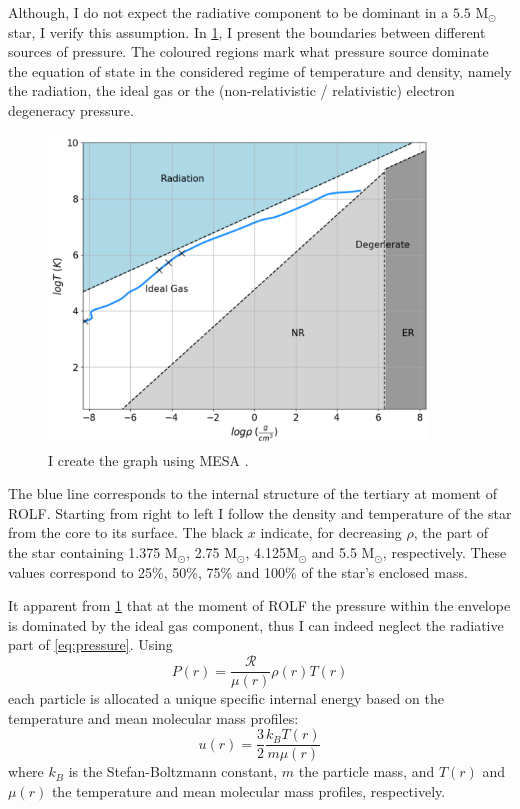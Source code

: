 Although, I do not expect the radiative component to be dominant in a $5.5$ M$_{\odot}$ star, I verify this assumption. In \cref{fig:eos}, I present the boundaries between different sources of pressure. The coloured regions mark what pressure source dominate the equation of state in the considered regime of temperature and density, namely the radiation, the ideal gas or the (non-relativistic / relativistic) electron degeneracy
pressure.
\begin{figure}[H]
    \centering
    \includegraphics[width=0.9\textwidth]{Thesis/graphs/eos.pdf}
    \caption{ I create the graph using MESA \citep{paxton2010modules,paxton2013modules,paxton2015modules,paxton2019modules}.}
    \label{fig:eos}
\end{figure}
The blue line corresponds to the internal structure of the tertiary at moment of ROLF. Starting from right to left I follow the density and temperature of the star from the core to its surface. The black $x$ indicate, for decreasing $\rho$, the part of the star containing 1.375 M$_{\odot}$, 2.75 M$_{\odot}$, 4.125M$_{\odot}$ and 5.5 M$_{\odot}$, respectively. These values correspond to 25\%, 50\%, 75\% and 100\% of the star's enclosed mass.

It apparent from \cref{fig:eos} that at the moment of ROLF the pressure within the envelope is dominated by the ideal gas component, thus I can indeed neglect the radiative part of \eqref{eq:pressure}. Using
\begin{equation}\label{eq:pressure_ideal_gass}
    P(r) =  \frac{\mathcal{R}}{\mu(r)} \rho(r) T(r)
\end{equation}
each particle is allocated a unique specific internal energy based on the temperature and mean molecular mass profiles:
\begin{equation}\label{eq:internal_energy}
    u(r) = \frac{3}{2} \frac{k_B T(r)}{m \mu(r)}
\end{equation}
where $k_B$ is the Stefan-Boltzmann constant, $m$ the particle mass, and $T(r)$ and $\mu(r)$ the temperature and mean molecular mass profiles, respectively.

